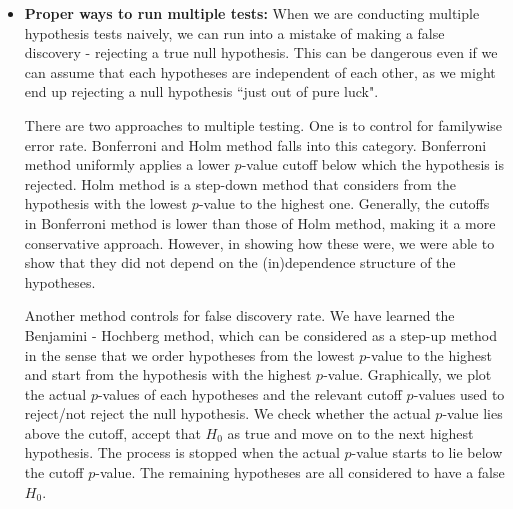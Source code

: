 \documentclass[12pt]{article}
\theoremstyle{definition}
\theoremstyle{property}
\theoremstyle{assumption}
\theoremstyle{example}
\theoremstyle{comment}
\begin{document}
\begin{itemize}
\item \textbf{Proper ways to run multiple tests:} When we are conducting multiple hypothesis tests naively, we can run into a mistake of making a false discovery - rejecting a true null hypothesis. This can be dangerous even if we can assume that each hypotheses are independent of each other, as we might end up rejecting a null hypothesis ``just out of pure luck". \par
There are two approaches to multiple testing. One is to control for familywise error rate. Bonferroni and Holm method falls into this category. Bonferroni method uniformly applies a lower $p$-value cutoff below which the hypothesis is rejected. Holm method is a step-down method that considers from the hypothesis with the lowest $p$-value to the highest one. Generally, the cutoffs in Bonferroni method is lower than those of Holm method, making it a more conservative approach. However, in showing how these were, we were able to show that they did not depend on the (in)dependence structure of the hypotheses. \par
Another method controls for false discovery rate. We have learned the Benjamini - Hochberg method, which can be considered as a step-up method in the sense that we order hypotheses from the lowest $p$-value to the highest and start from the hypothesis with the highest $p$-value. Graphically, we plot the actual $p$-values of each hypotheses and the relevant cutoff $p$-values used to reject/not reject the null hypothesis. We check whether the actual $p$-value lies above the cutoff, accept that $H_0$ as true and move on to the next highest hypothesis. The process is stopped when the actual $p$-value starts to lie below the cutoff $p$-value. The remaining hypotheses are all considered to have a false $H_0$. 
\end{itemize}
\end{document}
